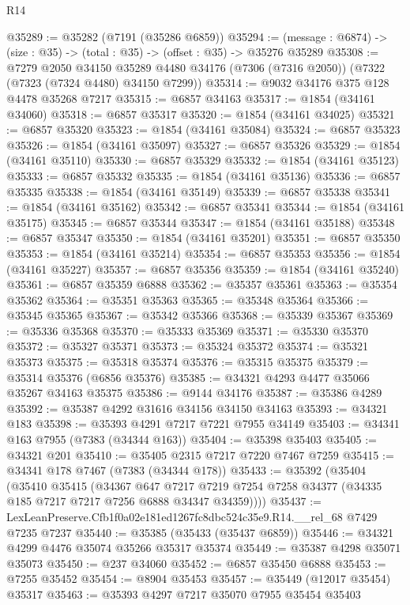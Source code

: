\begin{lexlean}{R14}
\begin{coremodule}
@35289 := @35282 (@7191 (@35286 @6859))
@35294 := (message : @6874) -> (size : @35) -> (total : @35) -> (offset : @35) -> @35276 @35289
@35308 := @7279
    @2050
    @34150
    @35289
    @4480
    @34176
    (@7306 (@7316 @2050))
    (@7322 (@7323 (@7324 @4480) @34150 @7299))
@35314 := @9032 @34176 @375 @128 @4478 @35268 @7217
@35315 := @6857 @34163
@35317 := @1854 (@34161 @34060)
@35318 := @6857 @35317
@35320 := @1854 (@34161 @34025)
@35321 := @6857 @35320
@35323 := @1854 (@34161 @35084)
@35324 := @6857 @35323
@35326 := @1854 (@34161 @35097)
@35327 := @6857 @35326
@35329 := @1854 (@34161 @35110)
@35330 := @6857 @35329
@35332 := @1854 (@34161 @35123)
@35333 := @6857 @35332
@35335 := @1854 (@34161 @35136)
@35336 := @6857 @35335
@35338 := @1854 (@34161 @35149)
@35339 := @6857 @35338
@35341 := @1854 (@34161 @35162)
@35342 := @6857 @35341
@35344 := @1854 (@34161 @35175)
@35345 := @6857 @35344
@35347 := @1854 (@34161 @35188)
@35348 := @6857 @35347
@35350 := @1854 (@34161 @35201)
@35351 := @6857 @35350
@35353 := @1854 (@34161 @35214)
@35354 := @6857 @35353
@35356 := @1854 (@34161 @35227)
@35357 := @6857 @35356
@35359 := @1854 (@34161 @35240)
@35361 := @6857 @35359 @6888
@35362 := @35357 @35361
@35363 := @35354 @35362
@35364 := @35351 @35363
@35365 := @35348 @35364
@35366 := @35345 @35365
@35367 := @35342 @35366
@35368 := @35339 @35367
@35369 := @35336 @35368
@35370 := @35333 @35369
@35371 := @35330 @35370
@35372 := @35327 @35371
@35373 := @35324 @35372
@35374 := @35321 @35373
@35375 := @35318 @35374
@35376 := @35315 @35375
@35379 := @35314 @35376 (@6856 @35376)
@35385 := @34321 @4293 @4477 @35066 @35267 @34163 @35375
@35386 := @9144 @34176
@35387 := @35386 @4289
@35392 := @35387 @4292 @31616 @34156 @34150 @34163
@35393 := @34321 @183
@35398 := @35393 @4291 @7217 @7221 @7955 @34149
@35403 := @34341 @163 @7955 (@7383 (@34344 @163))
@35404 := @35398 @35403
@35405 := @34321 @201
@35410 := @35405 @2315 @7217 @7220 @7467 @7259
@35415 := @34341 @178 @7467 (@7383 (@34344 @178))
@35433 := @35392
    (@35404
      (@35410
        @35415
        (@34367
          @647
          @7217
          @7219
          @7254
          @7258
          @34377
          (@34335 @185 @7217 @7217 @7256 @6888 @34347 @34359))))
@35437 := LexLeanPreserve.Cfb1f0a02e181ed1267fc8dbc524c35e9.R14.__rel_68 @7429 @7235 @7237
@35440 := @35385 (@35433 (@35437 @6859))
@35446 := @34321 @4299 @4476 @35074 @35266 @35317 @35374
@35449 := @35387 @4298 @35071 @35073
@35450 := @237 @34060
@35452 := @6857 @35450 @6888
@35453 := @7255 @35452
@35454 := @8904 @35453
@35457 := @35449 (@12017 @35454) @35317
@35463 := @35393 @4297 @7217 @35070 @7955 @35454 @35403

\end{coremodule}
\end{lexlean}
